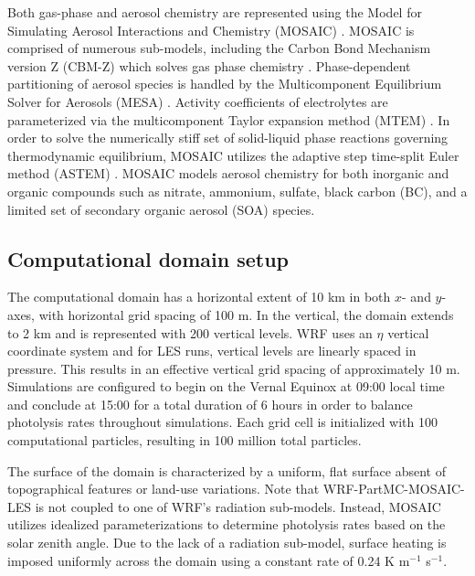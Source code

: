 \documentclass[journal abbreviation, manuscript]{copernicus}
\begin{document}
Both gas-phase and aerosol chemistry are represented using the Model for Simulating Aerosol Interactions and Chemistry (MOSAIC) \citep{zaveri_model_2008}. MOSAIC is comprised of numerous sub-models, including the Carbon Bond Mechanism version Z (CBM-Z) which solves gas phase chemistry \citep{zaveri_new_1999}. Phase-dependent partitioning of aerosol species is handled by the Multicomponent Equilibrium Solver for Aerosols (MESA) \citep{zaveri_computationally_2005}. Activity coefficients of electrolytes are parameterized via the multicomponent Taylor expansion method (MTEM) \citep{zaveri_new_2005}. In order to solve the numerically stiff set of solid-liquid phase reactions governing thermodynamic equilibrium, MOSAIC utilizes the adaptive step time-split Euler method (ASTEM) \citep{zaveri_model_2008}. MOSAIC models aerosol chemistry for both inorganic and organic compounds such as nitrate, ammonium, sulfate, black carbon (BC), and a limited set of secondary organic aerosol (SOA) species. 

\subsection{Computational domain setup}

The computational domain has a horizontal extent of 10 km in both $x$- and $y$-axes, with horizontal grid spacing of 100 m. In the vertical, the domain extends to 2 km and is represented with 200 vertical levels. WRF uses an $\eta$ vertical coordinate system and for LES runs, vertical levels are linearly spaced in pressure. This results in an effective vertical grid spacing of approximately 10 m. Simulations are configured to begin on the Vernal Equinox at 09:00 local time and conclude at 15:00 for a total duration of 6 hours in order to balance photolysis rates throughout simulations. Each grid cell is initialized with 100 computational particles, resulting in 100 million total particles. 

The surface of the domain is characterized by a uniform, flat surface absent of topographical features or land-use variations. Note that WRF-PartMC-MOSAIC-LES is not coupled to one of WRF's radiation sub-models. Instead,  
MOSAIC utilizes idealized parameterizations to determine photolysis rates based on the solar zenith angle. Due to the lack of a radiation sub-model, surface heating is imposed uniformly across the domain using a constant rate of 0.24 K m$^{-1}$ s$^{-1}$. 
\end{document}
